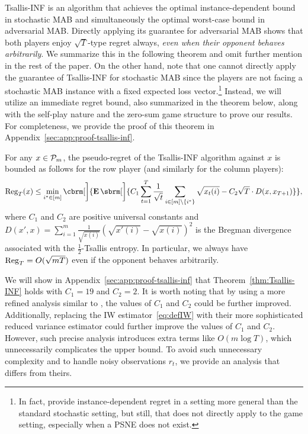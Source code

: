 Tsallis-INF is an algorithm that achieves the optimal
instance-dependent bound in stochastic MAB and simultaneously the optimal worst-case bound in adversarial MAB.
Directly applying its guarantee for adversarial MAB shows that both players enjoy $\sqrt{T}$-type regret always, \emph{even when their opponent behaves arbitrarily}.
We summarize this in the following theorem and omit further mention in the rest of the paper.
On the other hand, note that one cannot directly apply the guarantee of Tsallis-INF for stochastic MAB since the players are not facing a stochastic MAB instance with a fixed expected loss vector.\footnote{In fact,
\citet{zimmert2021tsallis} provide instance-dependent regret in a setting more general than the standard stochastic setting, 
but still, that does not directly apply to the game setting, especially when a PSNE does not exist.
}
Instead, we will utilize an immediate regret bound, also summarized in the theorem below, along with the self-play nature and the zero-sum game structure to prove our results.
For completeness,
we provide the proof of this theorem in Appendix~\ref{sec:app:proof-tsallis-inf}.
\begin{theorem}
    \label{thm:Tsallis-INF}
    For any $x \in \mathcal{P}_m$,
    the pseudo-regret of the Tsallis-INF algorithm against $x$ is bounded as follows for the row player (and similarly for the column players):
    \begin{align}\label{eq:Tsallis-INF-upper}
        \Rr_T(x)
        \le
        \min_{i^* \in [m]}
        \cbrm[\bigg]{
        \E \sbrm[\bigg]{
            C_1
            \sum_{t=1}^T
            \frac{1}{\sqrt{t}}
            \sum_{i \in [m] \setminus \{i^*\}}
            \sqrt{x_t(i)}
            -
            C_2
            \sqrt{T}
            \cdot
            D(x, x_{T+1})
        }
        },
    \end{align}
    where $C_1$ and $C_2$ are positive universal constants
    and
    $D(x', x) = 
    \sum_{i=1}^m \frac{1}{\sqrt{x(i)}}(\sqrt{x'(i)} - \sqrt{x(i)})^2
    $ 
    is the Bregman divergence associated with the $\frac{1}{2}$-Tsallis entropy.
    In particular, we always have $\mathrm{Reg}_T = O(\sqrt{mT})$ even if the opponent behaves arbitrarily.
\end{theorem}

We will show in Appendix~\ref{sec:app:proof-tsallis-inf} that Theorem~\ref{thm:Tsallis-INF} holds with $C_1 = 19$ and $C_2 = 2$.
It is worth noting that by using a more refined analysis similar to \citet{zimmert2021tsallis},  
the values of $C_1$ and $C_2$ could be further improved.
Additionally, replacing the IW estimator~\eqref{eq:defIW} with their more sophisticated reduced variance estimator could further improve the values of $C_1$ and $C_2$.
However, such precise analysis introduces extra terms like $O(m \log T)$,  
which unnecessarily complicates the upper bound.  
To avoid such unnecessary complexity and to handle noisy observations $r_t$,  
we provide an analysis that differs from theirs.


